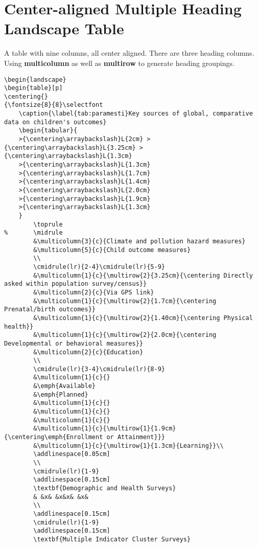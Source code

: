 \documentclass[12pt,english]{article}
\begin{document}
\clearpage

\section{Center-aligned Multiple Heading Landscape Table}

A table with nine columns, all center aligned. There are three heading columns. Using \textbf{multicolumn} as well as \textbf{multirow} to generate heading groupings. 

\begin{tiny}
\begin{verbatim}
\begin{landscape}
\begin{table}[p]
\centering{}
{\fontsize{8}{8}\selectfont
	\caption{\label{tab:paramesti}Key sources of global, comparative data on children's outcomes}
	\begin{tabular}{
	>{\centering\arraybackslash}L{2cm} >{\centering\arraybackslash}L{3.25cm} >{\centering\arraybackslash}L{1.3cm}
	>{\centering\arraybackslash}L{1.3cm}
	>{\centering\arraybackslash}L{1.7cm}
	>{\centering\arraybackslash}L{1.4cm}
	>{\centering\arraybackslash}L{2.0cm}
	>{\centering\arraybackslash}L{1.9cm}
	>{\centering\arraybackslash}L{1.3cm}
	}
		\toprule
% 		\midrule
		&\multicolumn{3}{c}{Climate and pollution hazard measures}
		&\multicolumn{5}{c}{Child outcome measures}
		\\
		\cmidrule(lr){2-4}\cmidrule(lr){5-9}
		&\multicolumn{1}{c}{\multirow{2}{3.25cm}{\centering Directly asked within population survey/census}}
		&\multicolumn{2}{c}{Via GPS link}
		&\multicolumn{1}{c}{\multirow{2}{1.7cm}{\centering Prenatal/birth outcomes}}
		&\multicolumn{1}{c}{\multirow{2}{1.40cm}{\centering Physical health}}
		&\multicolumn{1}{c}{\multirow{2}{2.0cm}{\centering Developmental or behavioral measures}}
		&\multicolumn{2}{c}{Education}
		\\
		\cmidrule(lr){3-4}\cmidrule(lr){8-9}
		&\multicolumn{1}{c}{}
		&\emph{Available}
		&\emph{Planned}
		&\multicolumn{1}{c}{}
		&\multicolumn{1}{c}{}
		&\multicolumn{1}{c}{}
		&\multicolumn{1}{c}{\multirow{1}{1.9cm}{\centering\emph{Enrollment or Attainment}}}
		&\multicolumn{1}{c}{\multirow{1}{1.3cm}{Learning}}\\
		\addlinespace[0.05cm]
		\\
		\cmidrule(lr){1-9}
		\addlinespace[0.15cm]
		\textbf{Demographic and Health Surveys}
		& &x& &x&x& &x&
		\\
		\addlinespace[0.15cm]
		\cmidrule(lr){1-9}
		\addlinespace[0.15cm]
		\textbf{Multiple Indicator Cluster Surveys}

\end{verbatim}
\end{tiny}
\end{document}
